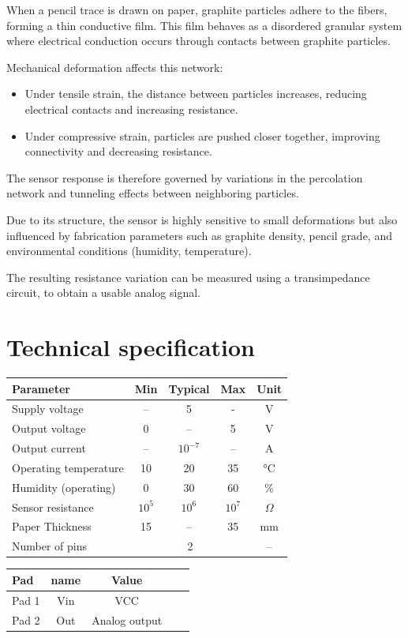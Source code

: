 \documentclass[a4paper,12pt,oneside,pdflatex,italian,final,twocolumn]{article}
\begin{document}
When a pencil trace is drawn on paper, graphite particles adhere to the fibers, forming a thin conductive film.
 This film behaves as a disordered granular system where electrical conduction occurs through contacts between graphite particles.

Mechanical deformation affects this network:
\begin{itemize}
    \item Under tensile strain, the distance between particles increases, reducing electrical contacts and increasing resistance.
    \item Under compressive strain, particles are pushed closer together, improving connectivity and decreasing resistance.
\end{itemize}

The sensor response is therefore governed by variations in the percolation network and tunneling effects between neighboring particles.

Due to its structure, the sensor is highly sensitive to small deformations but also influenced by fabrication parameters such as graphite density,
 pencil grade, and environmental conditions (humidity, temperature).

The resulting resistance variation can be measured using a transimpedance circuit, to obtain a usable analog signal.

\section{Technical specification}

\centering
\begin{tabular}{lcccc}
\toprule
Parameter & Min & Typical & Max & Unit \\
\midrule
Supply voltage & -- & 5 & - & V \\
Output voltage & 0 & -- & 5 & V \\
Output current & -- & $10^{-7}$ & -- & A \\
Operating temperature & 10 & 20 & 35 & °C \\
Humidity (operating) & 0 & 30 & 60 & \% \\
Sensor resistance & $10^5$ & $10^6$ & $10^7$ & $\Omega$ \\
Paper Thickness & 15& -- & 35 & mm \\
Number of pins & \multicolumn{3}{c}{2} & -- \\
\bottomrule

\end{tabular}
\begin{tabular}{lcccc}
\toprule
Pad & name & Value &\\
\midrule
Pad 1 & Vin & VCC  \\
Pad 2 & Out  & Analog output \\
\bottomrule
\end{tabular}
\end{document}
